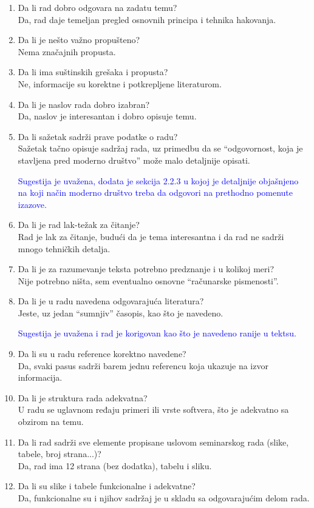 \documentclass[a4paper]{report}
\newcommand{\odgovor}[1]{\textcolor{blue}{#1}}
\begin{document}
\begin{enumerate}
\item Da li rad dobro odgovara na zadatu temu?\\
Da, rad daje temeljan pregled osnovnih principa i tehnika hakovanja.
\item Da li je nešto važno propušteno?\\
Nema značajnih propusta.
\item Da li ima suštinskih grešaka i propusta?\\
Ne, informacije su korektne i potkrepljene literaturom.
\item Da li je naslov rada dobro izabran?\\
Da, naslov je interesantan i dobro opisuje temu.
\item Da li sažetak sadrži prave podatke o radu?\\
Sažetak tačno opisuje sadržaj rada, uz primedbu da se ``odgovornost, koja je stavljena pred moderno društvo'' može malo detaljnije opisati.

\odgovor{Sugestija je uvažena, dodata je sekcija 2.2.3 u kojoj je detaljnije objašnjeno na koji način moderno društvo treba da odgovori na prethodno pomenute izazove.}

\item Da li je rad lak-težak za čitanje?\\
Rad je lak za čitanje, budući da je tema interesantna i da rad ne sadrži mnogo tehničkih detalja.
\item Da li je za razumevanje teksta potrebno predznanje i u kolikoj meri?\\
Nije potrebno ništa, sem eventualno osnovne ``računarske pismenosti''.
\item Da li je u radu navedena odgovarajuća literatura?\\
Jeste, uz jedan ``sumnjiv'' časopis, kao što je navedeno.

\odgovor{Sugestija je uvažena i rad je korigovan kao što je navedeno ranije u tektsu.}

\item Da li su u radu reference korektno navedene?\\
Da, svaki pasus sadrži barem jednu referencu koja ukazuje na izvor informacija.
\item Da li je struktura rada adekvatna?\\
U radu se uglavnom ređaju primeri ili vrste softvera, što je adekvatno sa obzirom na temu.
\item Da li rad sadrži sve elemente propisane uslovom seminarskog rada (slike, tabele, broj strana...)?\\
Da, rad ima 12 strana (bez dodatka), tabelu i sliku.
\item Da li su slike i tabele funkcionalne i adekvatne?\\
Da, funkcionalne su i njihov sadržaj je u skladu sa odgovarajućim delom rada.
\end{enumerate}
\end{document}
